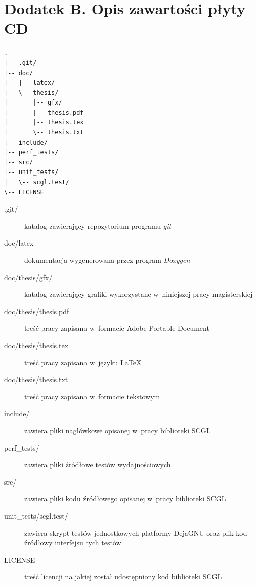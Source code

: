 \documentclass[a4paper,12pt,polish,twoside,openright]{thesis}
\begin{document}
\setlength{\parskip}{\oldparskip}

\chapter*{Dodatek B. Opis zawartości płyty CD}
\label{chap:cd}
\begin{lstlisting}[style=coden,caption={Struktura plików zamieszczonych na płycie CD}]
.
|-- .git/
|-- doc/
|   |-- latex/
|   \-- thesis/
|       |-- gfx/
|       |-- thesis.pdf
|       |-- thesis.tex
|       \-- thesis.txt
|-- include/
|-- perf_tests/
|-- src/
|-- unit_tests/
|   \-- scgl.test/
\-- LICENSE
\end{lstlisting}

\begin{description}
	\item [{.git/}] katalog zawierający repozytorium programu \emph{git}
	\item [{doc/latex}] dokumentacja wygenerowana przez program \emph{Doxygen}
	\item [{doc/thesis/gfx/}] katalog zawierający grafiki wykorzystane w~niniejszej pracy magisterskiej
	\item [{doc/thesis/thesis.pdf}] treść pracy zapisana w~formacie Adobe Portable Document
	\item [{doc/thesis/thesis.tex}] treść pracy zapisana w~języku \LaTeX
	\item [{doc/thesis/thesis.txt}] treść pracy zapisana w~formacie tekstowym
	\item [{include/}] zawiera pliki nagłówkowe opisanej w~pracy biblioteki SCGL
	\item [{perf\_tests/}] zawiera pliki źródłowe testów wydajnościowych
	\item [{src/}] zawiera pliki kodu źródłowego opisanej w~pracy biblioteki SCGL
	\item [{unit\_tests/scgl.test/}] zawiera skrypt testów jednostkowych platformy DejaGNU oraz plik kod źródłowy interfejsu tych testów
	\item [{LICENSE}] treść licencji na jakiej został udostępniony kod biblioteki SCGL
\end{description}

\listoffigures
\listoftables
\lstlistoflistings
\end{document}
